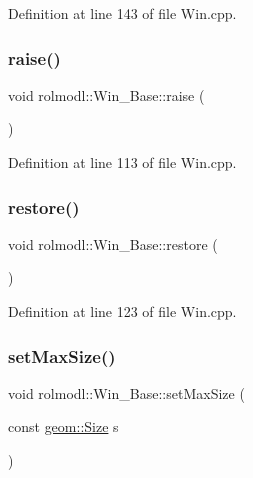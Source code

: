 Definition at line 143 of file Win.\+cpp.

\mbox{\label{classrolmodl_1_1_win___base_aecd20d7aa4e49e52052c2db0ecde2dd8}} 
\subsubsection{\texorpdfstring{raise()}{raise()}}
{\footnotesize\ttfamily void rolmodl\+::\+Win\+\_\+\+Base\+::raise (\begin{DoxyParamCaption}{ }\end{DoxyParamCaption})\hspace{0.3cm}{\ttfamily [noexcept]}}



Definition at line 113 of file Win.\+cpp.

\mbox{\label{classrolmodl_1_1_win___base_aabff037e2c27e271b09ea16a1886e810}} 
\subsubsection{\texorpdfstring{restore()}{restore()}}
{\footnotesize\ttfamily void rolmodl\+::\+Win\+\_\+\+Base\+::restore (\begin{DoxyParamCaption}{ }\end{DoxyParamCaption})\hspace{0.3cm}{\ttfamily [noexcept]}}



Definition at line 123 of file Win.\+cpp.

\mbox{\label{classrolmodl_1_1_win___base_a3e7388e8d6be96159334eecca325749c}} 
\subsubsection{\texorpdfstring{setMaxSize()}{setMaxSize()}}
{\footnotesize\ttfamily void rolmodl\+::\+Win\+\_\+\+Base\+::set\+Max\+Size (\begin{DoxyParamCaption}\item[{const \mbox{\hyperlink{structrolmodl_1_1geom_1_1_size}{geom\+::\+Size}}}]{s }\end{DoxyParamCaption})\hspace{0.3cm}{\ttfamily [noexcept]}}



